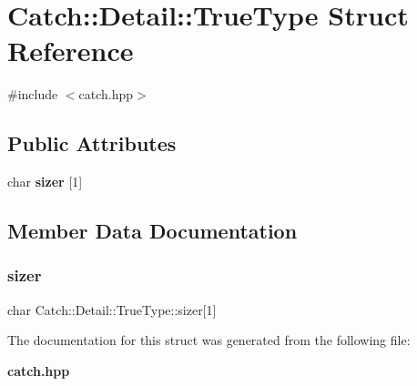 \section{Catch\+:\+:Detail\+:\+:True\+Type Struct Reference}
\label{struct_catch_1_1_detail_1_1_true_type}


{\ttfamily \#include $<$catch.\+hpp$>$}

\subsection*{Public Attributes}
\begin{DoxyCompactItemize}
\item 
char \textbf{ sizer} [1]
\end{DoxyCompactItemize}


\subsection{Member Data Documentation}
\mbox{\label{struct_catch_1_1_detail_1_1_true_type_a3aaaeb75909e668b293c8a81f5fb6419}} 
\subsubsection{sizer}
{\footnotesize\ttfamily char Catch\+::\+Detail\+::\+True\+Type\+::sizer[1]}



The documentation for this struct was generated from the following file\+:\begin{DoxyCompactItemize}
\item 
\textbf{ catch.\+hpp}\end{DoxyCompactItemize}
